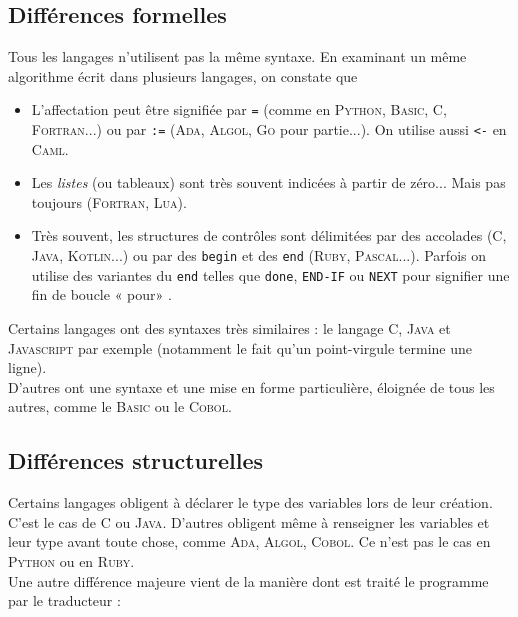 \subsection{Différences formelles}

Tous les langages n'utilisent pas la même syntaxe. En examinant un même algorithme écrit dans plusieurs langages, on constate que 

\begin{itemize}
    \item   L'affectation peut être signifiée par \texttt{=} (comme en \textsc{Python}, \textsc{Basic}, \textsc{C}, \textsc{Fortran}...) ou par \texttt{:=} (\textsc{Ada}, \textsc{Algol}, \textsc{Go} pour partie...). On utilise aussi \texttt{<-} en \textsc{Caml}.
    \item   Les \textit{listes} (ou tableaux) sont très souvent indicées à partir de zéro... Mais pas toujours (\textsc{Fortran}, \textsc{Lua}).
    \item   Très souvent, les structures de contrôles sont délimitées par des accolades (\textsc{C}, \textsc{Java},  \textsc{Kotlin}...) ou par des \texttt{begin} et des \texttt{end} (\textsc{Ruby}, \textsc{Pascal}...). Parfois on utilise des variantes du \texttt{end} telles que \texttt{done}, \texttt{END-IF} ou \texttt{NEXT} pour signifier une fin de boucle « pour» .
\end{itemize}

Certains langages ont des syntaxes très similaires : le langage \textsc{C}, \textsc{Java} et \textsc{Javascript} par exemple (notamment le fait qu'un point-virgule termine une ligne).\\
D'autres ont une syntaxe et une mise en forme particulière, éloignée de tous les autres, comme le \textsc{Basic} ou le \textsc{Cobol}.

\subsection{Différences structurelles}

Certains langages obligent à déclarer le type des variables lors de leur création. C'est le cas de \textsc{C} ou \textsc{Java}. D'autres obligent même à renseigner les variables et leur type avant toute chose, comme \textsc{Ada}, \textsc{Algol}, \textsc{Cobol}. Ce n'est pas le cas en \textsc{Python} ou en \textsc{Ruby}.\\

Une autre différence majeure vient de la manière dont est traité le programme par le traducteur :

